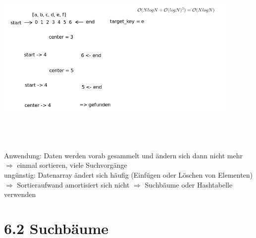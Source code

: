         \includegraphics[width=12cm,height=9cm,keepaspectratio]{./Pictures/binaereSuche.png}

        Anwendung: Daten werden vorab gesammelt und ändern sich dann nicht mehr\\
        $\Rightarrow$ einmal sortieren, viele Suchvorgänge\\

        ungünstig: Datenarray ändert sich häufig (Einfügen oder Löschen von Elementen)\\
        $\Rightarrow$ Sortieraufwand amortisiert sich nicht $\Rightarrow$ Suchbäume oder Hashtabelle verwenden

        \section*{6.2 Suchbäume}

